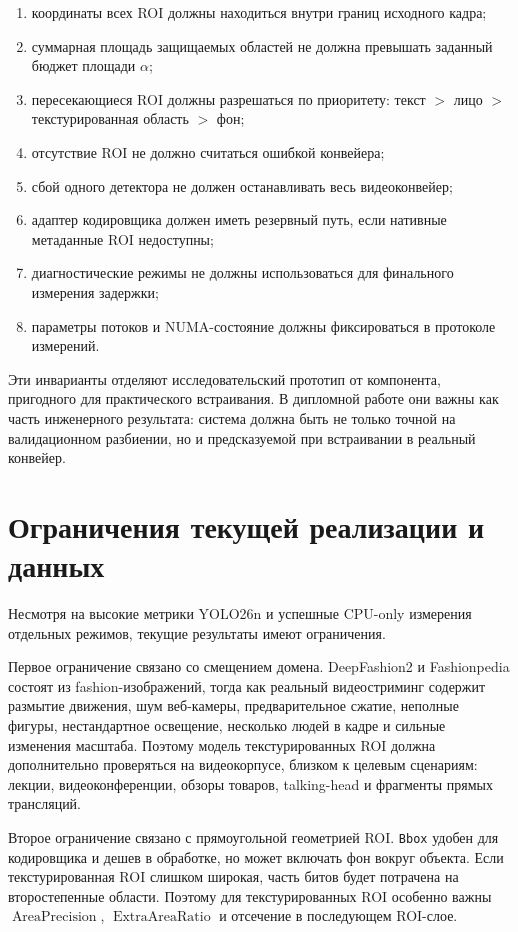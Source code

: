 \documentclass[12pt,a4paper,oneside,openany]{report}
\begin{document}
\begin{enumerate}[label=\arabic*)]
  \item координаты всех ROI должны находиться внутри границ исходного кадра;
  \item суммарная площадь защищаемых областей не должна превышать заданный бюджет площади
      $\alpha$;
  \item пересекающиеся ROI должны разрешаться по приоритету: текст $>$ лицо $>$ текстурированная
      область $>$ фон;
  \item отсутствие ROI не должно считаться ошибкой конвейера;
  \item сбой одного детектора не должен останавливать весь видеоконвейер;
  \item адаптер кодировщика должен иметь резервный путь, если нативные метаданные ROI недоступны;
  \item диагностические режимы не должны использоваться для финального измерения задержки;
  \item параметры потоков и NUMA-состояние должны фиксироваться в протоколе измерений.
\end{enumerate}

Эти инварианты отделяют исследовательский прототип от компонента, пригодного для практического
встраивания. В дипломной работе они важны как часть инженерного результата: система должна быть
не только точной на валидационном разбиении, но и предсказуемой при встраивании в реальный
конвейер.


\section{Ограничения текущей реализации и данных}

Несмотря на высокие метрики YOLO26n и успешные CPU-only измерения отдельных режимов, текущие
результаты имеют ограничения.

Первое ограничение связано со смещением домена. DeepFashion2 и Fashionpedia состоят из
fashion-изображений, тогда как реальный видеостриминг содержит размытие движения, шум
веб-камеры, предварительное сжатие, неполные фигуры, нестандартное освещение, несколько людей в
кадре и сильные изменения масштаба. Поэтому модель текстурированных ROI должна дополнительно
проверяться на видеокорпусе, близком к целевым сценариям: лекции, видеоконференции, обзоры
товаров, talking-head и фрагменты прямых трансляций.

Второе ограничение связано с прямоугольной геометрией ROI. \texttt{Bbox} удобен для кодировщика
и дешев в обработке, но может включать фон вокруг объекта. Если текстурированная ROI слишком
широкая, часть битов будет потрачена на второстепенные области. Поэтому для текстурированных ROI
особенно важны $\operatorname{AreaPrecision}$, $\operatorname{ExtraAreaRatio}$ и отсечение в
последующем ROI-слое.
\end{document}
